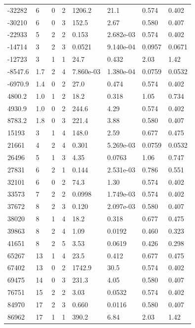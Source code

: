 \documentclass[preview]{standalone}
\begin{document}
{{\begin{tabular}{L{1.2cm}C{1.2cm} C{0.3cm}C{0.5cm} C{1.4cm}C{1.4cm} C{1.4cm}C{1.4cm}}
  -32282  &     6  & 0     &  2 &  1206.2  & 21.1  & 0.574 &  0.402   \\ 
  -30210  &     6  & 0     &  3 &  152.5  & 2.67  & 0.580 &  0.407   \\ 
  -22933  &     5  & 2     &  2 &  0.153  & 2.682e-03  & 0.574 &  0.402   \\ 
  -14714  &     3  & 2     &  3 &  0.0521  & 9.140e-04  & 0.0957 &  0.0671   \\ 
  -12723  &     3  & 1     &  1 &  24.7  & 0.432  & 2.03 &  1.42   \\ 
  -8547.6  &   1.7  & 2     &  4 &  7.860e-03  & 1.380e-04  & 0.0759 &  0.0532   \\ 
  -6970.9  &   1.4  & 0     &  2 &  27.0  & 0.474  & 0.574 &  0.402   \\ 
  4800.2  &   1.0  & 1     &  2 &  18.2  & 0.318  & 1.05 &  0.734   \\ 
  4930.9  &   1.0  & 0     &  2 &  244.6  & 4.29  & 0.574 &  0.402   \\ 
  8783.2  &   1.8  & 0     &  3 &  221.4  & 3.88  & 0.580 &  0.407   \\ 
  15193  &     3  & 1     &  4 &  148.0  & 2.59  & 0.677 &  0.475   \\ 
  21661  &     4  & 2     &  4 &  0.301  & 5.269e-03  & 0.0759 &  0.0532   \\ 
  26496  &     5  & 1     &  3 &  4.35  & 0.0763  & 1.06 &  0.747   \\ 
  27831  &     6  & 2     &  1 &  0.144  & 2.531e-03  & 0.786 &  0.551   \\ 
  32101  &     6  & 0     &  2 &  74.3  & 1.30  & 0.574 &  0.402   \\ 
  33573  &     7  & 2     &  2 &  0.0998  & 1.749e-03  & 0.574 &  0.402   \\ 
  37672  &     8  & 2     &  3 &  0.120  & 2.097e-03  & 0.580 &  0.407   \\ 
  38020  &     8  & 1     &  4 &  18.2  & 0.318  & 0.677 &  0.475   \\ 
  39863  &     8  & 2     &  4 &  1.09  & 0.0192  & 0.460 &  0.323   \\ 
  41651  &     8  & 2     &  5 &  3.53  & 0.0619  & 0.426 &  0.298   \\ 
  65267  &    13  & 1     &  4 &  23.5  & 0.412  & 0.677 &  0.475   \\ 
  67402  &    13  & 0     &  2 &  1742.9  & 30.5  & 0.574 &  0.402   \\ 
  69475  &    14  & 0     &  3 &  231.3  & 4.05  & 0.580 &  0.407   \\ 
  76751  &    15  & 2     &  2 &  3.03  & 0.0532  & 0.574 &  0.402   \\ 
  84970  &    17  & 2     &  3 &  0.660  & 0.0116  & 0.580 &  0.407   \\ 
  86962  &    17  & 1     &  1 &  390.2  & 6.84  & 2.03 &  1.42   \\ 
\hline 
\end{tabular} 

}}
\end{document}
